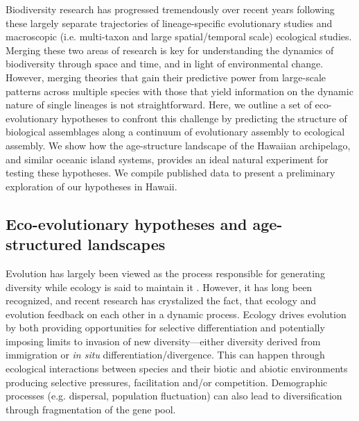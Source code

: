 \documentclass[12pt]{article}
\begin{document}
Biodiversity research has progressed tremendously over recent years
\citep{XXXX} following these largely separate trajectories of
lineage-specific evolutionary studies and macroscopic
(i.e. multi-taxon and large spatial/temporal scale) ecological
studies. Merging these two areas of research is key for understanding
the dynamics of biodiversity through space and time, and in light of
environmental change. However, merging theories that gain their
predictive power from large-scale patterns across multiple species
\citep{brown1995, harte2011} with those that yield information on the
dynamic nature of single lineages is not straightforward.  
Here, we outline a set of eco-evolutionary hypotheses to confront this
challenge by predicting the structure of biological assemblages along
a continuum of evolutionary assembly to ecological assembly. We show
how the age-structure landscape of the Hawaiian archipelago, and 
similar oceanic island systems, provides an ideal natural experiment
for testing these hypotheses. We compile published data to present a
preliminary exploration of our hypotheses in Hawaii.

\subsection*{Eco-evolutionary hypotheses and age-structured
  landscapes}

Evolution has largely been viewed as the process responsible for
generating diversity while ecology is said to maintain it
\citep{XXXX}. However, it has long been recognized, and recent research
has crystalized the fact, that ecology and evolution feedback on
each other in a dynamic process. Ecology drives evolution by both
providing opportunities for selective differentiation and potentially
imposing limits to invasion of new diversity---either diversity
derived from immigration or {\it in situ}
differentiation/divergence. This can happen through ecological
interactions between species and their biotic and abiotic environments
producing selective pressures, facilitation and/or
competition. Demographic processes (e.g. dispersal, population
fluctuation) can also lead to diversification through fragmentation of
the gene pool.
\end{document}
